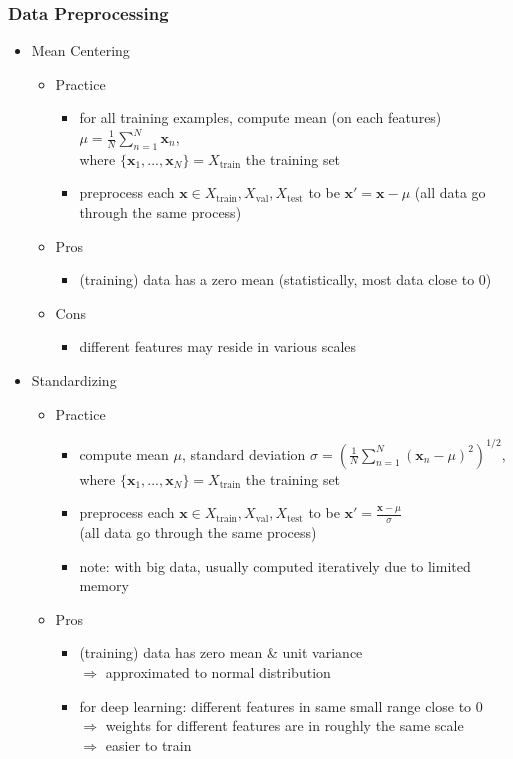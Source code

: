 \subsubsection{Data Preprocessing}
\begin{itemize}
\item Mean Centering
	\begin{itemize}
	\item Practice
		\begin{itemize}
		\item for all training examples, compute mean (on each features) $\displaystyle \mu=\frac 1 N \sum_{n=1}^N{\mathbf x_n}$, \\
		where $\{\mathbf x_1,...,\mathbf x_N\}=X_\text{train}$ the training set
		\item preprocess each $\mathbf x \in X_\text{train}, X_\text{val}, X_\text{test}$ to be $\mathbf x'=\mathbf x -\mu$
		(all data go through the same process)
		\end{itemize}
	\item Pros
		\begin{itemize}
		\item (training) data has a zero mean (statistically, most data close to $0$)
		\end{itemize}
	\item Cons
		\begin{itemize}
		\item different features may reside in various scales
		\end{itemize}
	\end{itemize}
\item Standardizing
	\begin{itemize}
	\item Practice
		\begin{itemize}
		\item compute mean $\mu$, standard deviation $\displaystyle \sigma=\left( \frac 1 N \sum_{n=1}^N{(\mathbf x_n-\mu)^2} \right)^{1/2}$, \\
		where $\{\mathbf x_1,...,\mathbf x_N\}=X_\text{train}$ the training set
		\item preprocess each $\mathbf x \in X_\text{train}, X_\text{val}, X_\text{test}$ to be $\mathbf x'=\frac{\mathbf x -\mu} \sigma$ \\ 
		(all data go through the same process)
		\item note: with big data, usually computed iteratively due to limited memory
		\end{itemize}
	\item Pros
		\begin{itemize}
		\item (training) data has zero mean \& unit variance \\
		$\Rightarrow$ approximated to normal distribution
		\item for deep learning: different features in same small range close to $0$ \\
		$\Rightarrow$ weights for different features are in roughly the same scale \\
		$\Rightarrow$ easier to train
		\end{itemize}
	\end{itemize}


\end{itemize}
